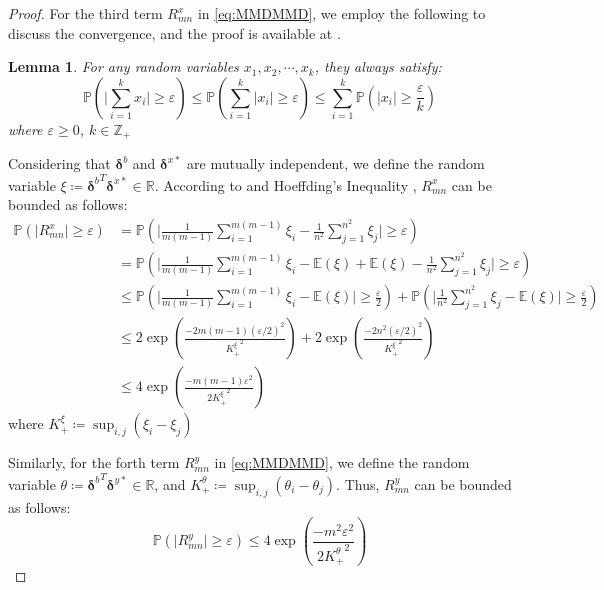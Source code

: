 \documentclass{article}
\newtheorem{lemma}{Lemma}[section]
\begin{document}
\begin{proof}
For the third term $R_{mn}^x$ in \eqref{eq:MMDMMD}, we employ the following  to discuss the convergence, and the proof is available at .
\begin{lemma}\label{le:1/nepsilon}
    For any random variables $x_1, x_2, \cdots, x_k$, they always satisfy:
    \begin{equation}
        \mathbb{P}\left(\Bigg|\sum_{i=1}^{k}x_i\Bigg| \geq \varepsilon\right) \leq \mathbb{P}\left(\sum_{i=1}^{k}|x_i| \geq \varepsilon\right) \leq \sum_{i=1}^{k}\mathbb{P}\left(|x_i| \geq \frac{\varepsilon}{k}\right)
    \end{equation}
    where $\varepsilon \geq 0$, $k \in \mathbb{Z}_+$
\end{lemma}
Considering that $\bm{\delta}^b$ and $\bm{\delta}^{x*}$ are mutually independent, we define the random variable $\xi \coloneqq {\bm{\delta}^b}^T\bm{\delta}^{x*} \in \mathbb{R}$.
According to  and Hoeffding's Inequality \cite{hoeffding1994probability}, $R_{mn}^x$ can be bounded as follows:
\begin{equation}\label{eq:3rd}
    \begin{aligned}
        \mathbb{P}(\big|R_{mn}^x\big| \geq \varepsilon) & = \mathbb{P}\left(\Bigg| \frac{1}{m(m-1)}\sum_{i=1}^{m(m-1)}\xi_i - \frac{1}{n^2}\sum_{j=1}^{n^2}\xi_j\Bigg| \geq \varepsilon\right) \\
        & = \mathbb{P}\left(\Bigg| \frac{1}{m(m-1)}\sum_{i=1}^{m(m-1)}\xi_i - \mathbb{E}(\xi) + \mathbb{E}(\xi) - \frac{1}{n^2}\sum_{j=1}^{n^2}\xi_j\Bigg| \geq \varepsilon\right) \\
        & \leq \mathbb{P}\left(\Bigg| \frac{1}{m(m-1)}\sum_{i=1}^{m(m-1)}\xi_i - \mathbb{E}(\xi) \Bigg| \geq \frac{\varepsilon}{2}\right) + \mathbb{P}\left(\Bigg| \frac{1}{n^2}\sum_{j=1}^{n^2}\xi_j - \mathbb{E}(\xi) \Bigg| \geq \frac{\varepsilon}{2}\right) \\
        & \leq 2\exp\left(\frac{-2m(m-1)(\varepsilon/2)^2}{{K_+^\xi}^2}\right) + 2\exp\left(\frac{-2n^2(\varepsilon/2)^2}{{K_+^\xi}^2}\right) \\
        & \leq 4\exp\left(\frac{-m(m-1)\varepsilon^2}{2{K_+^\xi}^2}\right)
    \end{aligned}
\end{equation}
where $K_+^\xi \coloneqq \sup_{i,j} (\xi_i - \xi_j)$

Similarly, for the forth term $R_{mn}^y$ in \eqref{eq:MMDMMD}, we define the random variable $\theta \coloneqq {\bm{\delta}^b}^T\bm{\delta}^{y*} \in \mathbb{R}$, 
and $K_+^\theta \coloneqq \sup_{i,j} (\theta_i - \theta_j)$. 
Thus, $R_{mn}^y$ can be bounded as follows:
\begin{equation}\label{eq:4th}
    \mathbb{P}(\big|R_{mn}^y\big| \geq \varepsilon) \leq 4\exp\left(\frac{-m^2\varepsilon^2}{2{K_+^\theta}^2}\right)
\end{equation}


\end{proof}
\end{document}
